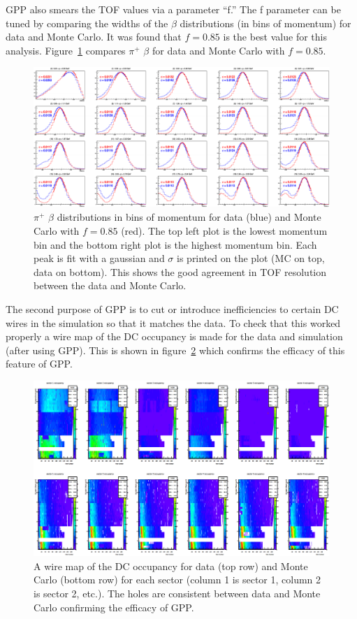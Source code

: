 GPP also smears the TOF values via a parameter ``f.''
The f parameter can be tuned by comparing the widths of the $\beta$ distributions (in bins of momentum) for data and Monte Carlo.
It was found that $f = 0.85$ is the best value for this analysis.
Figure~\ref{fig:TOFres_dataAndMC} compares $\pi^+$ $\beta$ for data and Monte Carlo with $f = 0.85$.
%
\begin{figure}
\centering
\includegraphics[width=8.5in]{figures/TOFres_dataAndMC.png}
\caption{$\pi^+$ $\beta$ distributions in bins of momentum for data (blue) and Monte Carlo with $f = 0.85$ (red). The top left plot is the lowest momentum bin and the bottom right plot is the highest momentum bin. Each peak is fit with a gaussian and $\sigma$ is printed on the plot (MC on top, data on bottom). This shows the good agreement in TOF resolution between the data and Monte Carlo.}
\label{fig:TOFres_dataAndMC}
\end{figure}
%

The second purpose of GPP is to cut or introduce inefficiencies to certain DC wires in the simulation so that it matches the data.
To check that this worked properly a wire map of the DC occupancy is made for the data and simulation (after using GPP).
This is shown in figure~\ref{fig:DCoccupancy} which confirms the efficacy of this feature of GPP.
%
\begin{figure}
\centering
\includegraphics[width=8.5in]{figures/DCoccupancy.png}
\caption{A wire map of the DC occupancy for data (top row) and Monte Carlo (bottom row) for each sector (column 1 is sector 1, column 2 is sector 2, etc.). The holes are consistent between data and Monte Carlo confirming the efficacy of GPP.}
\label{fig:DCoccupancy}
\end{figure}
%


